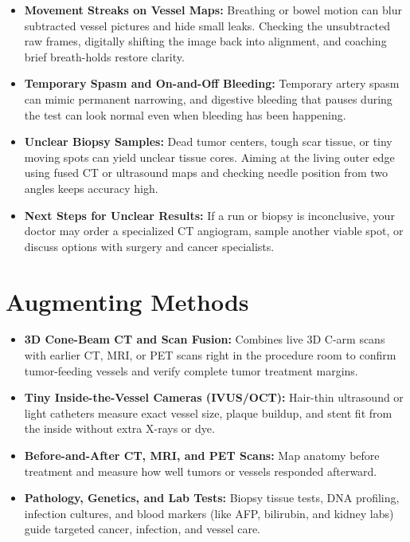 \begin{itemize}
    \item \textbf{Movement Streaks on Vessel Maps:} Breathing or bowel motion can blur subtracted vessel pictures and hide small leaks. Checking the unsubtracted raw frames, digitally shifting the image back into alignment, and coaching brief breath-holds restore clarity.
    \item \textbf{Temporary Spasm and On-and-Off Bleeding:} Temporary artery spasm can mimic permanent narrowing, and digestive bleeding that pauses during the test can look normal even when bleeding has been happening.
    \item \textbf{Unclear Biopsy Samples:} Dead tumor centers, tough scar tissue, or tiny moving spots can yield unclear tissue cores. Aiming at the living outer edge using fused CT or ultrasound maps and checking needle position from two angles keeps accuracy high.
    \item \textbf{Next Steps for Unclear Results:} If a run or biopsy is inconclusive, your doctor may order a specialized CT angiogram, sample another viable spot, or discuss options with surgery and cancer specialists.
\end{itemize}

\section{Augmenting Methods}

\begin{itemize}
    \item \textbf{3D Cone-Beam CT and Scan Fusion:} Combines live 3D C-arm scans with earlier CT, MRI, or PET scans right in the procedure room to confirm tumor-feeding vessels and verify complete tumor treatment margins.
    \item \textbf{Tiny Inside-the-Vessel Cameras (IVUS/OCT):} Hair-thin ultrasound or light catheters measure exact vessel size, plaque buildup, and stent fit from the inside without extra X-rays or dye.
    \item \textbf{Before-and-After CT, MRI, and PET Scans:} Map anatomy before treatment and measure how well tumors or vessels responded afterward.
    \item \textbf{Pathology, Genetics, and Lab Tests:} Biopsy tissue tests, DNA profiling, infection cultures, and blood markers (like AFP, bilirubin, and kidney labs) guide targeted cancer, infection, and vessel care.
\end{itemize}

